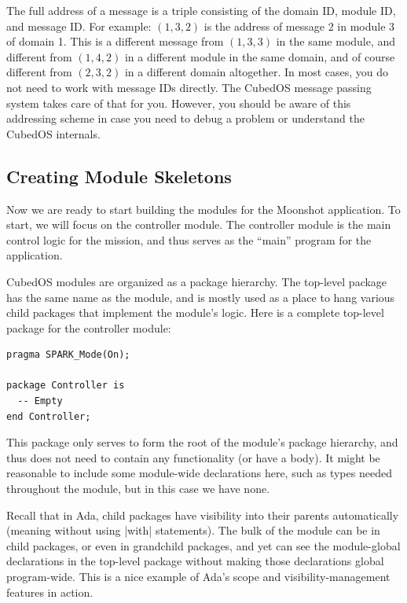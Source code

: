 The full address of a message is a triple consisting of the domain ID, module ID, and message
ID. For example: $(1, 3, 2)$ is the address of message 2 in module 3 of domain 1. This is a
different message from $(1, 3, 3)$ in the same module, and different from $(1, 4, 2)$ in a
different module in the same domain, and of course different from $(2, 3, 2)$ in a different
domain altogether. In most cases, you do not need to work with message IDs directly. The CubedOS
message passing system takes care of that for you. However, you should be aware of this
addressing scheme in case you need to debug a problem or understand the CubedOS internals.

\subsection{Creating Module Skeletons}
\label{sec:manual-tutorial-skeletons}

Now we are ready to start building the modules for the Moonshot application. To start,
we will focus on the controller module. The controller module is the main control logic for the
mission, and thus serves as the ``main'' program for the application.

CubedOS modules are organized as a package hierarchy. The top-level package has the same name as
the module, and is mostly used as a place to hang various child packages that implement the module's
logic. Here is a complete top-level package for the controller module:

\begin{verbatim}
pragma SPARK_Mode(On);

package Controller is
  -- Empty
end Controller;  
\end{verbatim}

This package only serves to form the root of the module's package hierarchy, and thus does not
need to contain any functionality (or have a body). It might be reasonable to include some
module-wide declarations here, such as types needed throughout the module, but in this case we
have none.

Recall that in Ada, child packages have visibility into their parents automatically (meaning
without using |with| statements). The bulk of the module can be in child packages, or even in
grandchild packages, and yet can see the module-global declarations in the top-level package
without making those declarations global program-wide. This is a nice example of Ada's scope and
visibility-management features in action.

